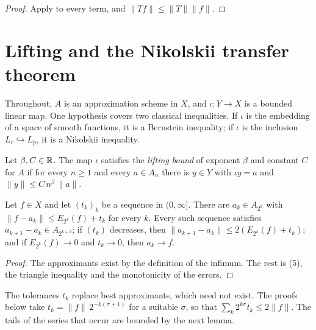 \begin{proof}
\leanok
Apply  to every term, and $\|Tf\| \leq \|T\| \|f\|$.
\end{proof}

\chapter{Lifting and the Nikolskii transfer theorem}
\label{ch:lifting}

Throughout, $A$ is an approximation scheme in $X$, and $\iota : Y \to X$ is a bounded linear
map. One hypothesis covers two classical inequalities. If $\iota$ is the embedding of a
space of smooth functions, it is a Bernstein inequality; if $\iota$ is the inclusion
$L_r \hookrightarrow L_p$, it is a Nikolskii inequality.

\begin{definition}
\label{def:lift-bound}
\leanok
{}
Let $\beta, C \in \mathbb{R}$. The map $\iota$ satisfies the \emph{lifting bound} of exponent $\beta$
and constant $C$ for $A$ if for every $n \geq 1$ and every $a \in A_n$ there is $y \in Y$ with
$\iota y = a$ and $\|y\| \leq C \, n^\beta \, \|a\|$.
\end{definition}

\begin{lemma}
\label{lem:near-best}
\leanok
{}
Let $f \in X$ and let $(t_k)_k$ be a sequence in $(0, \infty]$. There are $a_k \in A_{2^k}$
with $\|f - a_k\| \leq E_{2^k}(f) + t_k$ for every $k$. Every such sequence satisfies
$a_{k+1} - a_k \in A_{2^{k+2}}$; if $(t_k)$ decreases, then
$\|a_{k+1} - a_k\| \leq 2 (E_{2^k}(f) + t_k)$; and if $E_{2^k}(f) \to 0$ and $t_k \to 0$, then
$a_k \to f$.
\end{lemma}

\begin{proof}
\leanok
The approximants exist by the definition of the infimum. The rest is
(5), the triangle inequality and the monotonicity of the errors.
\end{proof}

The tolerances $t_k$ replace best approximants, which need not exist. The proofs below take
$t_k = \|f\| \, 2^{-k(\sigma+1)}$ for a suitable $\sigma$, so that
$\sum_k 2^{k\sigma} t_k \leq 2 \|f\|$. The tails of the series that occur are bounded by the
next lemma.

